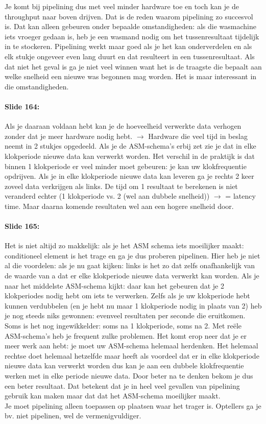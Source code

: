 \documentclass[10pt,a4paper]{book}
\begin{document}
Je komt bij pipelining dus met veel minder hardware toe en toch kan je de throughput naar boven drijven. Dat is de reden waarom pipelining zo succesvol is. Dat kan alleen gebeuren onder bepaalde omstandigheden: als die wasmachine iets vroeger gedaan is, heb je een wasmand nodig om het tussenresultaat tijdelijk in te stockeren. Pipelining werkt maar goed als je het kan onderverdelen en als elk stukje ongeveer even lang duurt en dat resulteert in een tussenresultaat. Als dat niet het geval is ga je niet veel winnen want het is de traagste die bepaalt aan welke snelheid een nieuwe was begonnen mag worden. Het is maar interessant in die omstandigheden.

\paragraph{Slide 164:} Als je daaraan voldaan hebt kan je de hoeveelheid verwerkte data verhogen zonder dat je meer hardware nodig hebt. $\rightarrow$ Hardware die veel tijd in beslag neemt in 2 stukjes opgedeeld. Als je de ASM-schema's erbij zet zie je dat in elke klokperiode nieuwe data kan verwerkt worden. Het verschil in de praktijk is dat binnen 1 klokperiode er veel minder moet gebeuren: je kan uw klokfrequentie opdrijven. Als je in elke klokperiode nieuwe data kan leveren ga je rechts 2 keer zoveel data verkrijgen als links. De tijd om 1 resultaat te berekenen is niet veranderd echter (1 klokperiode vs. 2 (wel aan dubbele snelheid)) $\rightarrow$ = latency time. Maar daarna komende resultaten wel aan een hogere snelheid door. 

\paragraph{Slide 165:} Het is niet altijd zo makkelijk: als je het ASM schema iets moeilijker maakt: conditioneel element is het trage en ga je dus proberen pipelinen. Hier heb je niet al die voordelen: als je nu gaat kijken: links is het zo dat zelfs onafhankelijk van de waarde van a dat er elke klokperiode nieuwe data verwerkt kan worden. Als je naar het middelste ASM-schema kijkt: daar kan het gebeuren dat je 2 klokperiodes nodig hebt om iets te verwerken. Zelfs als je uw klokperiode hebt kunnen verdubbelen (en je hebt nu maar 1 klokperiode nodig in plaats van 2) heb je nog steeds niks gewonnen: evenveel resultaten per seconde die eruitkomen. Soms is het nog ingewikkelder: soms na 1 klokperiode, soms na 2. Met re\"ele ASM-schema's heb je frequent zulke problemen. Het komt erop neer dat je er meer werk aan hebt: je moet uw ASM-schema helemaal herdenken. Het helemaal rechtse doet helemaal hetzelfde maar heeft als voordeel dat er in elke klokperiode nieuwe data kan verwerkt worden dus kan je aan een dubbele klokfrequentie werken met in elke periode nieuwe data. Door beter na te denken bekom je dus een beter resultaat. Dat betekent dat je in heel veel gevallen van pipelining gebruik kan maken maar dat dat het ASM-schema moeilijker maakt.\\
Je moet pipelining alleen toepassen op plaatsen waar het trager is. Optellers ga je bv. niet pipelinen, wel de vermenigvuldiger. 
\end{document}
